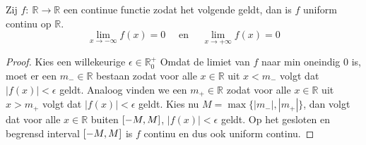 \documentclass[main.tex]{subfiles}
\begin{document}
\begin{st}
  Zij $f:\ \mathbb{R} \rightarrow \mathbb{R}$ een continue functie zodat het volgende geldt, dan is $f$ uniform continu op $\mathbb{R}$.
  \[ \lim_{x \rightarrow -\infty}f(x) = 0 \quad\text{ en }\quad \lim_{x \rightarrow +\infty}f(x) = 0 \]

  \begin{proof}
    Kies een willekeurige $\epsilon \in \mathbb{R}_{0}^{+}$
    Omdat de limiet van $f$ naar min oneindig $0$ is, moet er een $m_{-}\in \mathbb{R}$ bestaan zodat voor alle $x\in \mathbb{R}$ uit $x < m_{-}$ volgt dat $|f(x)| < \epsilon$ geldt.
    Analoog vinden we een $m_{+} \in \mathbb{R}$ zodat voor alle $x\in \mathbb{R}$ uit $x > m_{+}$ volgt dat $|f(x)| < \epsilon$ geldt.
    Kies nu $M = \max\{|m_{-}|,|m_{+}|\}$, dan volgt dat voor alle $x\in \mathbb{R}$ buiten $\interval{-M}{M}$, $|f(x)| < \epsilon$ geldt.\waarom
    Op het gesloten en begrensd interval $\interval{-M}{M}$ is $f$ continu en dus ook uniform continu.
\feed
{}
  \end{proof}
\end{st}
\end{document}

